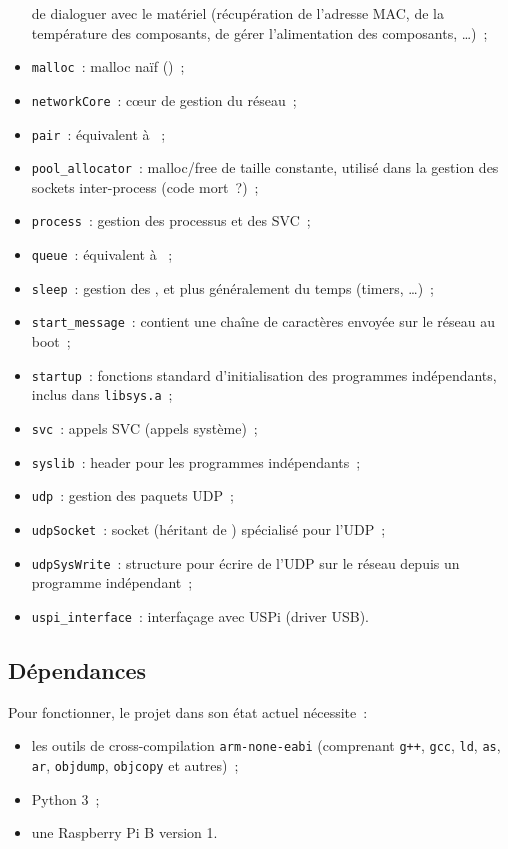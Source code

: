 \documentclass[11pt,a4paper]{article}
\newcommand{\fname}[1]{\texttt{#1}} %
\begin{document}
\begin{itemize}
		de dialoguer avec le matériel (récupération de l'adresse MAC, 
		de la température des composants, de gérer l'alimentation des
		composants, \ldots)~;
	\item \fname{malloc}~: malloc naïf ()~;
	\item \fname{networkCore}~: cœur de gestion du réseau~;
	\item \fname{pair}~: équivalent à ~;
	\item \fname{pool\_allocator}~: malloc/free de taille constante, utilisé
		dans la gestion des sockets inter-process (code mort~?)~;
	\item \fname{process}~: gestion des processus et des SVC~;
	\item \fname{queue}~: équivalent à ~;
	\item \fname{sleep}~: gestion des , et plus généralement
		du temps (timers, \ldots)~;
	\item \fname{start\_message}~: contient une chaîne de caractères envoyée
		sur le réseau au boot~;
	\item \fname{startup}~: fonctions standard d'initialisation des programmes
		indépendants, inclus dans \fname{libsys.a}~;
	\item \fname{svc}~: appels SVC (appels système)~;
	\item \fname{syslib}~: header pour les programmes indépendants~;
	\item \fname{udp}~: gestion des paquets UDP~;
	\item \fname{udpSocket}~: socket (héritant de )
		spécialisé pour l'UDP~;
	\item \fname{udpSysWrite}~: structure pour écrire de l'UDP sur le
		réseau depuis un programme indépendant~;
	\item \fname{uspi\_interface}~: interfaçage avec USPi (driver USB).
\end{itemize}

\subsection{Dépendances}

Pour fonctionner, le projet dans son état actuel nécessite~:
\begin{itemize}
	\item les outils de cross-compilation \texttt{arm-none-eabi} (comprenant
		\fname{g++}, \fname{gcc}, \fname{ld}, \fname{as}, \fname{ar},
		\fname{objdump}, \fname{objcopy} et autres)~;
	\item Python 3~;
	\item une Raspberry Pi B version 1.
\end{itemize}
\end{document}
